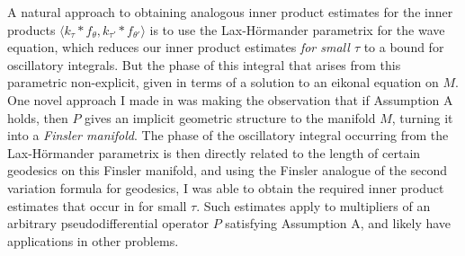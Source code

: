 \documentclass[11pt]{article}
\DeclareMathOperator{\RR}{\mathbb{R}}
\begin{document}

A natural approach to obtaining analogous inner product estimates for the inner products $\langle k_\tau * f_\theta, k_{\tau'} * f_{\theta'} \rangle$ is to use the Lax-H\"{o}rmander parametrix for the wave equation, which reduces our inner product estimates \emph{for small $\tau$} to a bound for oscillatory integrals. But the phase of this integral that arises from this parametric non-explicit, given in terms of a solution to an eikonal equation on $M$. One novel approach I made in \cite{DensonCharacterization} was making the observation that if Assumption A holds, then $P$ gives an implicit geometric structure to the manifold $M$, turning it into a \emph{Finsler manifold}. %
The phase of the oscillatory integral occurring from the Lax-H\"{o}rmander parametrix is then directly related to the length of certain geodesics on this Finsler manifold, and using the Finsler analogue of the second variation formula for geodesics, I was able to obtain the required inner product estimates that occur in \cite{HeoNazarovSeeger} for small $\tau$. Such estimates apply to multipliers of an arbitrary pseudodifferential operator $P$ satisfying Assumption A, and likely have applications in other problems.
\end{document}
